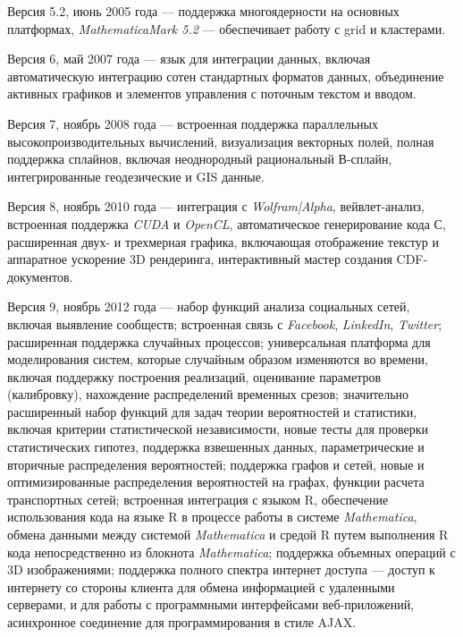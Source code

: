 \begin{textitemize}
	\item Версия 5.2, июнь 2005 года --- поддержка многоядерности на основных платформах, \textit{MathematicaMark 5.2} --- обеспечивает работу с grid и кластерами.
	\item Версия 6, май 2007 года --- язык для интеграции данных, включая автоматическую интеграцию сотен стандартных форматов данных, объединение активных графиков и элементов управления с поточным текстом и вводом.
	\item Версия 7, ноябрь 2008 года --- встроенная поддержка параллельных высокопроизводительных вычислений, визуализация векторных полей, полная поддержка сплайнов, включая неоднородный рациональный В-сплайн, интегрированные геодезические и GIS данные.
	\item Версия 8, ноябрь 2010 года --- интеграция с \textit{Wolfram|Alpha}, вейвлет-анализ, встроенная поддержка \textit{CUDA} и \textit{OpenCL}, автоматическое генерирование кода С, расширенная двух- и трехмерная графика, включающая отображение текстур и аппаратное ускорение 3D рендеринга, интерактивный мастер создания CDF-документов.
	\item Версия 9, ноябрь 2012 года --- набор функций анализа социальных сетей, включая выявление сообществ; встроенная связь с \textit{Facebook}, \textit{LinkedIn}, \textit{Twitter}; расширенная поддержка случайных процессов; универсальная платформа для моделирования систем, которые случайным образом изменяются во времени, включая поддержку построения реализаций, оценивание параметров (калибровку), нахождение распределений временных срезов; значительно расширенный набор функций для задач теории вероятностей и статистики, включая критерии статистической независимости, новые тесты для проверки статистических гипотез, поддержка взвешенных данных, параметрические и вторичные распределения вероятностей; поддержка графов и сетей, новые и оптимизированные распределения вероятностей на графах, функции расчета транспортных сетей; встроенная интеграция с языком R, обеспечение использования кода на языке R в процессе работы в системе \textit{Mathematica}, обмена данными между системой \textit{Mathematica} и средой R путем выполнения R кода непосредственно из блокнота \textit{Mathematica}; поддержка объемных операций с 3D изображениями; поддержка полного спектра интернет доступа --- доступ к интернету со стороны клиента для обмена информацией с удаленными серверами, и для работы с программными интерфейсами веб-приложений, асинхронное соединение для программирования в стиле AJAX.

\end{textitemize}
